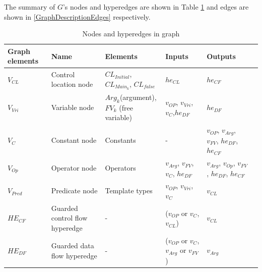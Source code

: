 \documentclass{article}
\begin{document}
The summary of $G$'s nodes and hyperedges are shown in Table \ref{GraphDescriptionNodes} and edges are shown in \ref{GraphDescriptionEdges} respectively.
\begin{table}\caption{Nodes and hyperedges in graph} \label{GraphDescriptionNodes}
\begin{center}
\begin{tabular}{lp{3cm}p{3cm}p{3cm}p{3cm}p{3cm}}
\hline
Graph elements & Name & Elements & Inputs & Outputs \\
\hline
$V_{CL}$  & Control location node            & $CL_{Initial}$, $CL_{Main_{k}}$, $CL_{false}$   & $he_{CL}$                                        & $he_{CF}$\\
$V_{Vri}$ & Variable node                    & $Arg_{k}$(argument),$FV_{k}$ (free variable)    &  $v_{OP}$, $v_{Vri}$,  $v_{C}$,$he_{DF}$         & $he_{DF}$\\
$V_{C}$   & Constant node                    & Constants                                       & -                                                & $v_{OP}$, $v_{Arg}$, $v_{FV}$, $he_{DF}$, $he_{CF}$\\
$V_{Op}$  & Operator node                    & Operators                                       & $v_{Arg}$, $v_{FV}$, $v_{C}$, $he_{DF}$          &$v_{Arg}$, $v_{Op}$, $v_{FV}$, $he_{DF}$, $he_{CF}$\\
$V_{Pred}$ &Predicate node                   & Template types                                  & $v_{OP}$, $v_{Vri}$, $v_{C}$                      & $v_{CL}$ \\
$HE_{CF}$ & Guarded control flow hyperedge   & -                                               & ($v_{OP}$ or $v_{C}$, $v_{CL}$)                  & $v_{CL}$\\
$HE_{DF}$ & Guarded data flow hyperedge      & -                                               & ($v_{OP}$ or $v_{C}$, $v_{Arg}$ or $v_{FV}$)     & $v_{Arg}$\\
\hline
\end{tabular}
\end{center}
\end{table}
\end{document}

